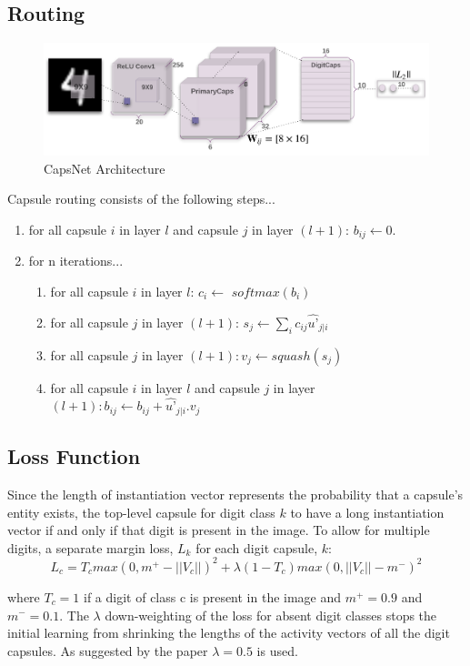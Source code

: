 \documentclass[10pt,twocolumn,letterpaper]{article}
\begin{document}
\subsection{Routing}
\begin{figure}[ht]
	\includegraphics[width=\textwidth]{1}
	\caption{CapsNet Architecture}
\end{figure}
Capsule routing consists of the following steps...
\begin{enumerate}
	\item for all capsule $i$ in layer $l$ and capsule $j$ in layer $(l + 1)$: $b_{ij} \leftarrow 0$.
	\item for n iterations...
	\begin{enumerate}
		\item for all capsule $i$ in layer $l$: $c_i \leftarrow$ $softmax(b_i)$
		\item for all capsule $j$ in layer $(l + 1)$: $s_j \leftarrow \sum_i c_{ij} \hat{u’}_{j|i}$
		\item for all capsule $j$ in layer $(l + 1): v_j \leftarrow squash(s_j)$
		\item for all capsule $i$ in layer $l$ and capsule $j$ in layer $(l + 1): b_{ij} \leftarrow b_{ij} + \hat{u’}_{j|i}.v_j$
	\end{enumerate}
\end{enumerate}

\subsection{Loss Function}
Since the length of instantiation vector represents the probability that a capsule’s entity exists, the top-level capsule for digit class $k$ to have a long instantiation vector if and only if that digit is present in the image. To allow for multiple digits, a separate margin loss, $L_k$ for each digit capsule, $k$:
\[ L_c = T_c max(0,m^+ - ||V_c||)^2 + \lambda(1-T_c)max(0,||V_c|| - m^-)^2 \]

where $T_c = 1$ if a digit of class c is present in the image and $m^+ = 0.9$ and $m^- = 0.1$. The $\lambda$ down-weighting of the loss for absent digit classes stops the initial learning from shrinking the lengths of the activity vectors of all the digit capsules. As suggested by the paper $\lambda = 0.5$ is used.
\end{document}
